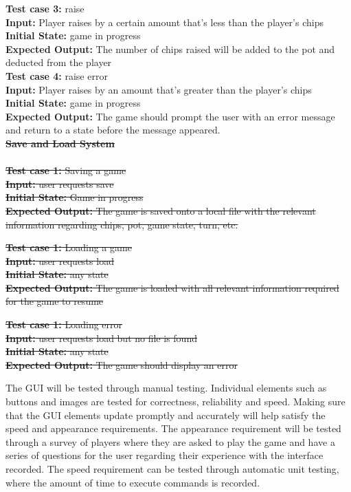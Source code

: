 \documentclass[12pt]{article}
\begin{document}
    \noindent \textbf{Test case 3:} raise \\
    \textbf{Input:} Player raises by a certain amount that’s less than the player’s chips\\
    \textbf{Initial State: }game in progress\\
	\textbf{Expected Output:} The number of chips raised will be added to the pot and deducted from
the player\\
    
    \noindent \textbf {Test case 4:} raise error \\
    \textbf{Input:} Player raises by an amount that’s greater than the player’s chips\\
	\textbf{Initial State:} game in progress\\
	\textbf{Expected Output:} The game should prompt the user with an error message and return to
	a state before the message appeared.\\
	
	\sout{\noindent \textbf{Save and Load System} \\
	\\
	\noindent \textbf{Test case 1:} Saving a game\\
	\textbf{Input:} user requests save\\
	\textbf{Initial State:} Game in progress\\
	\textbf{Expected Output:} The game is saved onto a local file with the relevant information regarding chips, pot, game state, turn, etc. }
	
	\sout{\noindent \textbf{Test case 1:} Loading a game\\
	\textbf{Input:} user requests load\\
	\textbf{Initial State:} any state\\
	\textbf{Expected Output:} The game is loaded with all relevant information required for the game to resume}
	
	\sout{\noindent \textbf{Test case 1:} Loading error\\
	\textbf{Input:} user requests load but no file is found\\
	\textbf{Initial State:} any state \\
	\textbf{Expected Output:} The game should display an error \\}

The GUI will be tested through manual testing. Individual elements such as buttons and images are tested for correctness, reliability and speed. Making sure that the GUI elements update promptly and accurately will help satisfy the speed and appearance requirements. The appearance requirement will be tested through a survey of players where they are asked to play the game and have a series of questions for the user regarding their experience with the interface recorded. The speed requirement can be tested through automatic unit testing, where the amount of time to execute commands is recorded. 
\end{document}
